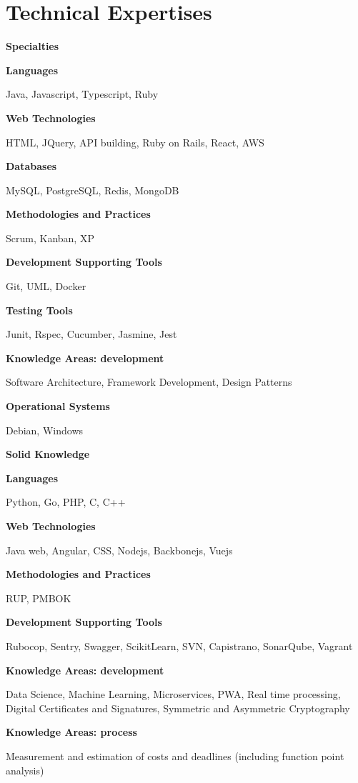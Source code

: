 \section{Technical Expertises}
{\fontsize{20}{30}\selectfont \textbf{Specialties}}\newline{}

\textbf{Languages}

Java, Javascript, Typescript, Ruby \newline{}

\textbf{Web Technologies}

HTML, JQuery, API building, Ruby on Rails, React, AWS \newline{}

\textbf{Databases}

MySQL, PostgreSQL, Redis, MongoDB \newline{}

\textbf{Methodologies and Practices}

Scrum, Kanban, XP \newline{}

\textbf{Development Supporting Tools}

Git, UML, Docker \newline{}

\textbf{Testing Tools}

Junit, Rspec, Cucumber, Jasmine, Jest \newline{}

\textbf{Knowledge Areas: development}

Software Architecture, Framework Development, Design Patterns \newline{}

\textbf{Operational Systems}

Debian, Windows \newline{}

{\fontsize{20}{30}\selectfont \textbf{Solid Knowledge}}\newline{}

\textbf{Languages}

Python, Go, PHP, C, C++ \newline{}

\textbf{Web Technologies}

Java web, Angular, CSS, Nodejs, Backbonejs, Vuejs \newline{}

\textbf{Methodologies and Practices}

RUP, PMBOK \newline{}

\textbf{Development Supporting Tools}

Rubocop, Sentry, Swagger, ScikitLearn, SVN, Capistrano, SonarQube, Vagrant \newline{}

\textbf{Knowledge Areas: development}

Data Science, Machine Learning, Microservices, PWA, Real time processing, Digital Certificates and Signatures, Symmetric and Asymmetric Cryptography \newline{}

\textbf{Knowledge Areas: process}

Measurement and estimation of costs and deadlines (including function point analysis) \newline{}
